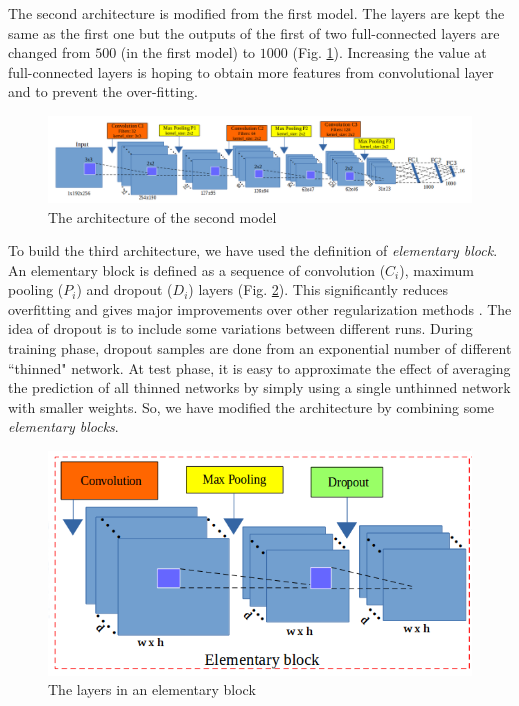 \documentclass[review]{elsarticle}
\begin{document}
The second architecture is modified from the first model. The layers are kept the same as the first one but the outputs of the first of two full-connected layers are changed from $500$ (in the first model) to $1000$ (Fig. \ref{fignet2}). Increasing the value at full-connected layers is hoping to obtain more features from convolutional layer and to prevent the over-fitting. 

\begin{figure}[h]
	\centering
	\includegraphics[scale=0.3]{images/net2}
	\caption{The architecture of the second model}
	\label{fignet2}
\end{figure}

To build the third architecture, we have used the definition of \textit{elementary block}. An {elementary block} is defined as a sequence of convolution ($C_{i}$), maximum pooling ($P_i$) and dropout ($D_i$) layers (Fig. \ref{figelementary}). This significantly reduces overfitting and gives major improvements over other regularization methods \cite{srivastava2014dropout}. The idea of dropout is to include some variations between different runs. During training phase, dropout samples are done from an exponential number of different ``thinned" network. At test phase, it is easy to approximate the effect of averaging the prediction of all thinned networks by simply using a single unthinned network with smaller weights. So, we have modified the architecture by combining some \textit{elementary blocks}. 

\begin{figure}[h]
	\centering
	\includegraphics[scale=0.3]{images/elementary_block}
	\caption{The layers in an elementary block}
	\label{figelementary}
\end{figure}
\end{document}
